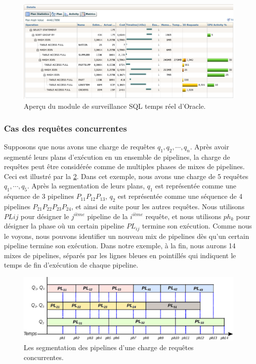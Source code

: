 \begin{figure}
 \centering
 \includegraphics[scale=0.65]{chapitre4/chap4Fig/tpch-q9-sqlmonitor.png}
 \caption{Aperçu du module de surveillance SQL temps réel d'Oracle.}
 \label{fig:tpch-q9-sqlmonitor}
\end{figure}

\subsubsection{Cas des requêtes concurrentes}
Supposons que nous avons une charge de requêtes $q_1, q_2, \cdots, q_n$. Après avoir segmenté leurs plans d'exécution en un ensemble de pipelines, la charge de requêtes peut être considérée comme de multiples phases de mixes de pipelines. Ceci est illustré par la \ref{fig:concurent-pipelines}. Dans cet exemple, nous avons une charge de 5 requêtes $q_1, \cdots, q_5$. Après la segmentation de leurs plans, $q_1$ est représentée comme une séquence de 3 pipelines $P_{11} P_{12} P_{13}$, $q_2$ est représentée comme une séquence de 4 pipelines $P_{21} P_{22} P_{23} P_{24}$, et ainsi de suite pour les autres requêtes. Nous utilisons $PL{ij}$ pour désigner le $j^{ième}$ pipeline de la $i^{ième}$ requête, et nous utilisons $ph_{k}$ pour désigner la phase où un certain pipeline $PL_{ij}$ termine son exécution. Comme nous le voyons, nous pouvons identifier un nouveau mix de pipelines dès qu'un certain pipeline termine son exécution. Dans notre exemple, à la fin, nous aurons 14 mixes de pipelines, séparés par les lignes bleues en pointillés qui indiquent le temps de fin d'exécution de chaque pipeline.

\begin{figure}
 \centering
 \includegraphics[scale=0.9]{chapitre4/chap4Fig/concurent-pipelines.eps}
 \caption{Les segmentation des pipelines d'une charge de requêtes concurrentes.}
 \label{fig:concurent-pipelines}
\end{figure}

